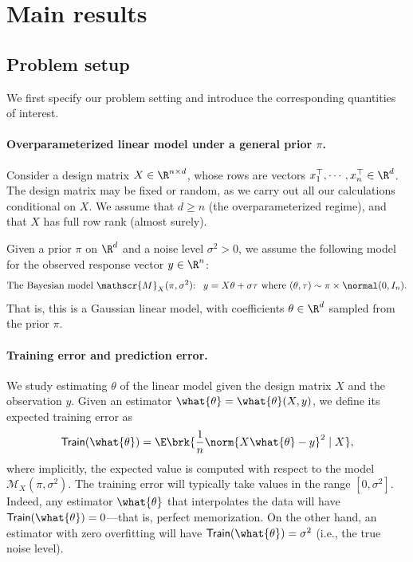 \documentclass[11pt]{article}
\newcommand{\trerr}{\mathsf{Train}}
\newcommand{\model}{\mathscr{M}}
\newcommand{\eqdst}{\stackrel{\mathsf{d}}{=}}
\begin{document}



\section{Main results} \label{sec:main}
\subsection{Problem setup}\label{sec:problem_setup}
We first specify our problem setting and introduce the corresponding quantities of interest.

\paragraph{Overparameterized linear model under a general prior $\pi$.} Consider a design matrix $X\in\R^{n\times d}$,  whose rows are vectors $x_1^\top, \cdots, x_n^\top \in \R^d$. The design matrix may be fixed or random, as we carry out all our calculations conditional on $X$. We assume that $d\geq n$ (the overparameterized regime), and that $X$ has full row rank (almost surely). 

Given a prior $\pi$ on $\R^d$ and a noise level $\sigma^2>0$, we assume the following model for the observed response vector $y\in\R^n$:
\[\textnormal{The Bayesian model $\model_X(\pi,\sigma^2)$: \ $y = X\theta + \sigma \tau$ where $(\theta,\tau)\sim \pi \times \normal(0, I_n)$.}\]
That is, this is a Gaussian linear model, with coefficients $\theta\in\R^d$ sampled from the prior $\pi$.

\paragraph{Training error and prediction error.}
We study estimating $\theta$ of the linear model given the design matrix $X$ and the observation $y$. Given an estimator $\what{\theta} = \what{\theta}(X,y)$, we define its expected training error as
\[\trerr(\what{\theta}) = \E \brk{\frac{1}{n} \norm{X \what{\theta} - y}^2 \mid X},\]
where implicitly, the expected value is computed with respect to the model $\model_X(\pi,\sigma^2)$. The training error will typically take values in the range $[0,\sigma^2]$. Indeed,
any estimator $\what{\theta}$ that interpolates the data will have $\trerr(\what{\theta})=0$---that is, perfect memorization. On the other hand, an estimator with zero overfitting will have $\trerr(\what{\theta})=\sigma^2$ (i.e., the true noise level).
\end{document}

